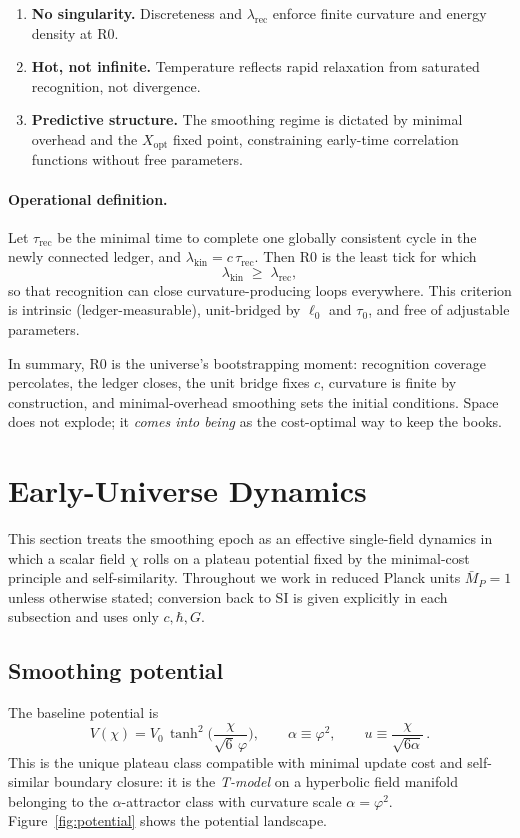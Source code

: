 \documentclass[11pt]{article}
\theoremstyle{definition}
\theoremstyle{remark}
\begin{document}
\begin{enumerate}
\item \textbf{No singularity.} Discreteness and \(\lambda_{\mathrm{rec}}\) enforce finite curvature and energy density at R0.
\item \textbf{Hot, not infinite.} Temperature reflects rapid relaxation from saturated recognition, not divergence.
\item \textbf{Predictive structure.} The smoothing regime is dictated by minimal overhead and the \(X_{\mathrm{opt}}\) fixed point, constraining early-time correlation functions without free parameters.
\end{enumerate}

\paragraph{Operational definition.} Let \(\tau_{\mathrm{rec}}\) be the minimal time to complete one globally consistent cycle in the newly connected ledger, and \(\lambda_{\mathrm{kin}}=c\,\tau_{\mathrm{rec}}\). Then R0 is the least tick for which
\[
\lambda_{\mathrm{kin}}\;\ge\;\lambda_{\mathrm{rec}},
\]
so that recognition can close curvature-producing loops everywhere. This criterion is intrinsic (ledger-measurable), unit-bridged by \(\ell_0\) and \(\tau_0\), and free of adjustable parameters.

In summary, R0 is the universe’s bootstrapping moment: recognition coverage percolates, the ledger closes, the unit bridge fixes \(c\), curvature is finite by construction, and minimal-overhead smoothing sets the initial conditions. Space does not explode; it \emph{comes into being} as the cost-optimal way to keep the books.

\section{Early-Universe Dynamics}
This section treats the smoothing epoch as an effective single-field dynamics in which a scalar field \(\chi\) rolls on a plateau potential fixed by the minimal-cost principle and self-similarity. Throughout we work in reduced Planck units \(\bar M_{\!P}=1\) unless otherwise stated; conversion back to SI is given explicitly in each subsection and uses only \(c,\hbar,G\).

\subsection{Smoothing potential}
The baseline potential is
\begin{equation}
  V(\chi)=V_0\,\tanh^2\!\Big(\frac{\chi}{\sqrt{6}\,\varphi}\Big), 
  \qquad \alpha\equiv\varphi^2,
  \qquad u\equiv \frac{\chi}{\sqrt{6\alpha}} \, .
  \label{eq:V}
\end{equation}
This is the unique plateau class compatible with minimal update cost and self-similar boundary closure: it is the \emph{T-model} on a hyperbolic field manifold belonging to the \(\alpha\)-attractor class \citep{KalloshLinde2013} with curvature scale \(\alpha=\varphi^2\). Figure~\ref{fig:potential} shows the potential landscape.
\end{document}
